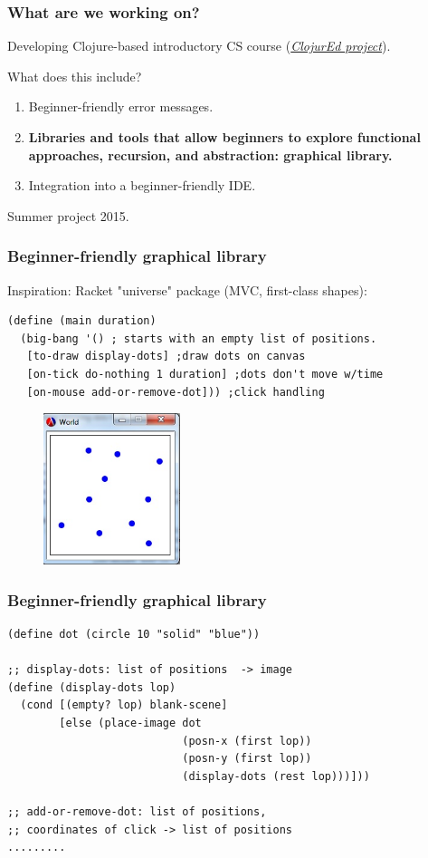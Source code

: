 \documentclass{beamer}
\begin{document}
\begin{frame}
\frametitle{What are we working on?}
Developing Clojure-based introductory CS course ({\it \href{http://cda.morris.umn.edu/~elenam/\#clojure}{ClojurEd project}}). 

What does this include? 
\begin{enumerate}
\item Beginner-friendly error messages. 
\item {\bf Libraries and tools that allow beginners to explore functional approaches, recursion, and abstraction: graphical library.}
\item Integration into a beginner-friendly IDE. 
\end{enumerate}
Summer project 2015. 
\end{frame}

\begin{frame}[fragile]
\frametitle{Beginner-friendly graphical library}
Inspiration: Racket "universe" package (MVC, first-class shapes):
\begin{verbatim}
(define (main duration)
  (big-bang '() ; starts with an empty list of positions.
   [to-draw display-dots] ;draw dots on canvas
   [on-tick do-nothing 1 duration] ;dots don't move w/time
   [on-mouse add-or-remove-dot])) ;click handling
\end{verbatim}
\begin{figure}[h]
\includegraphics[width=4cm]{PresentationImages/dots.jpg}
\end{figure}
\end{frame}

\begin{frame}[fragile]
\frametitle{Beginner-friendly graphical library}
\begin{verbatim}
(define dot (circle 10 "solid" "blue"))

;; display-dots: list of positions  -> image
(define (display-dots lop)     
  (cond [(empty? lop) blank-scene]
        [else (place-image dot
                           (posn-x (first lop))
                           (posn-y (first lop))
                           (display-dots (rest lop)))]))

;; add-or-remove-dot: list of positions, 
;; coordinates of click -> list of positions
.........
\end{verbatim}

\end{frame}
\end{document}
